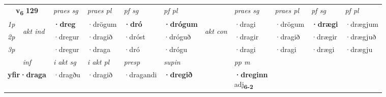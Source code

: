 \noindent
\begin{tabular}{lllllllllll} \toprule
\multicolumn{2}{c}{\textbf{v{\textsubscript{6}}} \Large{\textbf{129}}}  &  \textit{praes sg}  & \textit{praes pl}  &\textit{ pf sg} & \textit{pf pl} &  &  \textit{praes sg}  & \textit{praes pl}  & \textit{pf sg} & \textit{pf pl } \\*
	\cmidrule{3-6} \cmidrule{8-11}
 {\textit{1p}} & \multirow{3}{*}{\begin{turn}{90}\textit{akt ind}\end{turn}} & \textbf{·dreg} & ·drögum & \textbf{·dró} & \textbf{·drógum} & \multirow{3}{*}{\begin{turn}{90}\textit{akt con}\end{turn}} &·dragi & ·drögum & \textbf{·drægi} & ·drægjum\\*
 {\textit{2p}} &  &  ·dregur  & ·dragið & ·dróst & ·dróguð & & ·dragir & ·dragið & ·drægir & ·drægjuð \\*
{\textit{3p}} &  & ·dregur & ·draga & ·dró & ·drógu & & ·dragi & ·dragi& ·drægi & ·drægju \\*
\cmidrule{3-6} \cmidrule{8-11}

   \multicolumn{2}{c}{\textit{inf}}  & \textit{i akt sg} & \textit{i akt pl}   & \textit{presp} & \textit{supin}  && \textit{pp m} \\*
  \multicolumn{2}{c}{\textbf{yfir\allowbreak ·draga}} & ·dragðu  & ·dragið   & ·dragandi &  \textbf{·dregið}  && \specialcell{\textbf{·dreginn} \\ adj\textbf{\textsubscript{6-2}}} \\*
\end{tabular}

